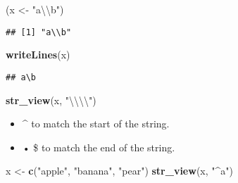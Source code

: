\documentclass[
]{article}
\newenvironment{Shaded}{\begin{snugshade}}{\end{snugshade}}
\newcommand{\CharTok}[1]{\textcolor[rgb]{0.31,0.60,0.02}{#1}}
\newcommand{\KeywordTok}[1]{\textcolor[rgb]{0.13,0.29,0.53}{\textbf{#1}}}
\newcommand{\NormalTok}[1]{#1}
\newcommand{\StringTok}[1]{\textcolor[rgb]{0.31,0.60,0.02}{#1}}
\providecommand{\tightlist}{%
  \setlength{\itemsep}{0pt}\setlength{\parskip}{0pt}}
\begin{document}
\hypertarget{htmlwidget-debcf8aa0c27c210dd5e}{}
\begin{str_view}

\end{str_view}

\begin{Shaded}
\begin{Highlighting}[]
\NormalTok{(x \textless{}{-}}\StringTok{ "a}\CharTok{\textbackslash{}\textbackslash{}}\StringTok{b"}\NormalTok{)}
\end{Highlighting}
\end{Shaded}

\begin{verbatim}
## [1] "a\\b"
\end{verbatim}

\begin{Shaded}
\begin{Highlighting}[]
\KeywordTok{writeLines}\NormalTok{(x)}
\end{Highlighting}
\end{Shaded}

\begin{verbatim}
## a\b
\end{verbatim}

\begin{Shaded}
\begin{Highlighting}[]
\KeywordTok{str\_view}\NormalTok{(x, }\StringTok{"}\CharTok{\textbackslash{}\textbackslash{}\textbackslash{}\textbackslash{}}\StringTok{"}\NormalTok{)}
\end{Highlighting}
\end{Shaded}

\hypertarget{htmlwidget-cc611a856e1ef0c61cf4}{}
\begin{str_view}

\end{str_view}

\begin{itemize}
\tightlist
\item
  \^{} to match the start of the string.
\item
  • \$ to match the end of the string.
\end{itemize}

\begin{Shaded}
\begin{Highlighting}[]
\NormalTok{x \textless{}{-}}\StringTok{ }\KeywordTok{c}\NormalTok{(}\StringTok{"apple"}\NormalTok{, }\StringTok{"banana"}\NormalTok{, }\StringTok{"pear"}\NormalTok{)}
\KeywordTok{str\_view}\NormalTok{(x, }\StringTok{"\^{}a"}\NormalTok{)}
\end{Highlighting}
\end{Shaded}
\end{document}
